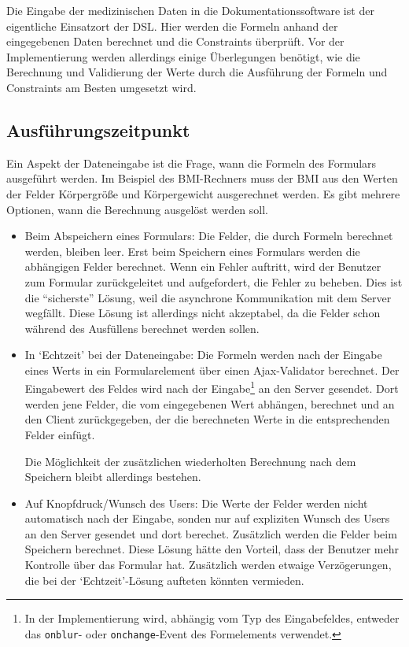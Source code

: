 Die Eingabe der medizinischen Daten in die Dokumentationssoftware ist der eigentliche Einsatzort der DSL. Hier werden die Formeln anhand der eingegebenen Daten berechnet und die Constraints überprüft. Vor der Implementierung werden allerdings einige Überlegungen benötigt, wie die Berechnung und Validierung der Werte durch die Ausführung der Formeln und Constraints am Besten umgesetzt wird.


\subsection{Ausführungszeitpunkt}

Ein Aspekt der Dateneingabe ist die Frage, wann die Formeln des Formulars ausgeführt werden. Im Beispiel des BMI-Rechners muss der BMI aus den Werten der Felder Körpergröße und Körpergewicht ausgerechnet werden. Es gibt mehrere Optionen, wann die Berechnung ausgelöst werden soll.

\begin{itemize}
	\item Beim Abspeichern eines Formulars: Die Felder, die durch Formeln berechnet werden, bleiben leer. Erst beim Speichern eines Formulars werden die abhängigen Felder berechnet. Wenn ein Fehler auftritt, wird der Benutzer zum Formular zurückgeleitet und aufgefordert, die Fehler zu beheben. Dies ist die ``sicherste'' Lösung, weil die asynchrone Kommunikation mit dem Server wegfällt. Diese Lösung ist allerdings nicht akzeptabel, da die Felder schon während des Ausfüllens berechnet werden sollen.

	\item In `Echtzeit' bei der Dateneingabe: Die Formeln werden nach der Eingabe eines Werts in ein Formularelement über einen Ajax-Validator berechnet. Der Eingabewert des Feldes wird nach der Eingabe\footnote{In der Implementierung wird, abhängig vom Typ des Eingabefeldes, entweder das \texttt{onblur}- oder \texttt{onchange}-Event des Formelements verwendet.} an den Server gesendet. Dort werden jene Felder, die vom eingegebenen Wert abhängen, berechnet und an den Client zurückgegeben, der die berechneten Werte in die entsprechenden Felder einfügt.

	Die Möglichkeit der zusätzlichen wiederholten Berechnung nach dem Speichern bleibt allerdings bestehen.

	\item Auf Knopfdruck/Wunsch des Users: Die Werte der Felder werden nicht automatisch nach der Eingabe, sonden nur auf expliziten Wunsch des Users an den Server gesendet und dort berechet. Zusätzlich werden die Felder beim Speichern berechnet. Diese Lösung hätte den Vorteil, dass der Benutzer mehr Kontrolle über das Formular hat. Zusätzlich werden etwaige Verzögerungen, die bei der `Echtzeit'-Lösung aufteten könnten vermieden.
\end{itemize}


